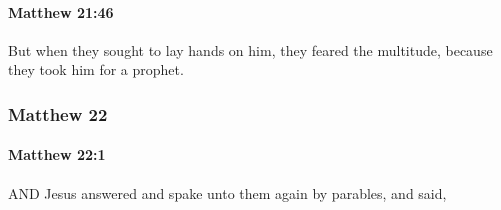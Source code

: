 		\paragraph{Matthew 21:46} %
			\label{MATTHEW-21-46}

			But when they sought to lay hands on him, they feared the multitude, because they took him for a prophet.

			\begin{framed}
			\scriptsize
				\begin{compactdesc}
					\item[SBLG] 
				\end{compactdesc}
			\end{framed}

	\subsubsection{Matthew 22} %
		\label{MATTHEW-22}
		
		\paragraph{Matthew 22:1} %
			\label{MATTHEW-22-1}

			AND Jesus answered and spake unto them again by parables, and said,

